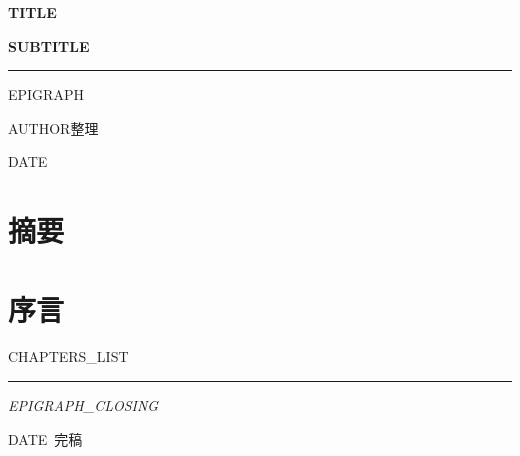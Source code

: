\documentclass[a4paper, 11pt, twoside]{ctexrep}
\begin{document}
\thispagestyle{empty}
\begin{center}
\vspace*{5cm}
{\Huge\bfseries {{TITLE}}\par}
\vspace{0.8cm}
{\Large\bfseries {{SUBTITLE}}\par}
\vspace{1.5cm}
\rule{0.7\textwidth}{0.4pt}\par
\vspace{1cm}
{\large {{EPIGRAPH}}\par}
\vspace{4cm}
{\large {{AUTHOR}}\quad 整理\par}
\vspace{0.8cm}
{\large {{DATE}}\par}
\end{center}
\newpage

\thispagestyle{empty}
\chapter*{摘\quad 要}


\newpage

\thispagestyle{empty}
\chapter*{序\quad 言}



\newpage

\thispagestyle{empty}
\renewcommand{\contentsname}{目\quad 录}
\tableofcontents
\newpage

{{CHAPTERS_LIST}}


\vspace{2em}
\begin{center}
\rule{0.5\textwidth}{0.4pt}\par
\vspace{0.5cm}
{\large\itshape {{EPIGRAPH_CLOSING}}\par}
\vspace{0.3cm}
{\small {{DATE}}\ 完稿\par}
\end{center}
\end{document}
